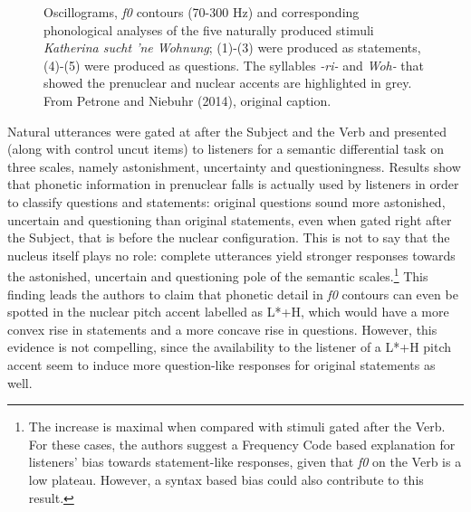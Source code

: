 \begin{figure}
\centering
{}
\caption{Oscillograms, \textit{f0} contours (70-300 Hz) and corresponding phonological analyses of the five naturally produced stimuli \textit{Katherina sucht 'ne Wohnung}; (1)-(3) were produced as statements, (4)-(5) were produced as questions. The syllables \textit{-ri-} and \textit{Woh-} that showed the prenuclear and nuclear accents are highlighted in grey. From Petrone and Niebuhr (2014), original caption.}
\label{fig302}\end{figure}

Natural utterances were gated at after the Subject and the Verb and presented (along with control uncut items) to listeners for a semantic differential task on three scales, namely astonishment, uncertainty and questioningness. Results show that phonetic information in prenuclear falls is actually used by listeners in order to classify questions and statements: original questions sound more astonished, uncertain and questioning than original statements, even when gated right after the Subject, that is before the nuclear configuration. This is not to say that the nucleus itself plays no role: complete utterances yield stronger responses towards the astonished, uncertain and questioning pole of the semantic scales.\footnote{The increase is maximal when compared with stimuli gated after the Verb. For these cases, the authors suggest a Frequency Code based explanation for listeners' bias towards statement-like responses, given that \textit{f0} on the Verb is a low plateau. However, a syntax based bias could also contribute to this result.} This finding leads the authors to claim that phonetic detail in \textit{f0} contours can even be spotted in the nuclear pitch accent labelled as L*+H, which would have a more convex rise in statements and a more concave rise in questions. However, this evidence is not compelling, since the availability to the listener of a L*+H pitch accent seem to induce more question-like responses for original statements as well.

